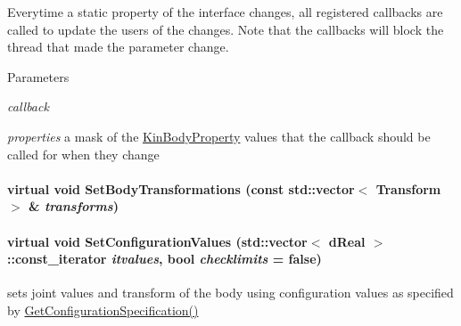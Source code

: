 Everytime a static property of the interface changes, all registered callbacks are called to update the users of the changes. Note that the callbacks will block the thread that made the parameter change. 
\begin{DoxyParams}{Parameters}
\item[{\em callback}]\item[{\em properties}]a mask of the \hyperlink{classOpenRAVE_1_1KinBody_a973dd96959f97246c92245c42bce238f}{KinBodyProperty} values that the callback should be called for when they change \end{DoxyParams}
\hypertarget{classOpenRAVE_1_1KinBody_a0cbd54ab25b8c1f3466092b54180d266}{
\paragraph[{SetBodyTransformations}]{\setlength{\rightskip}{0pt plus 5cm}virtual void SetBodyTransformations (const std::vector$<$ Transform $>$ \& {\em transforms})}\hfill}
\label{classOpenRAVE_1_1KinBody_a0cbd54ab25b8c1f3466092b54180d266}
\hypertarget{classOpenRAVE_1_1KinBody_ad5dc4cc6b247465c2522c31a9169cfd0}{
\paragraph[{SetConfigurationValues}]{\setlength{\rightskip}{0pt plus 5cm}virtual void SetConfigurationValues (std::vector$<$ dReal $>$::const\_\-iterator {\em itvalues}, \/  bool {\em checklimits} = {\ttfamily false})}\hfill}
\label{classOpenRAVE_1_1KinBody_ad5dc4cc6b247465c2522c31a9169cfd0}


sets joint values and transform of the body using configuration values as specified by \hyperlink{classOpenRAVE_1_1KinBody_a4e917473a7d475324af43320f83796fc}{GetConfigurationSpecification()} 



